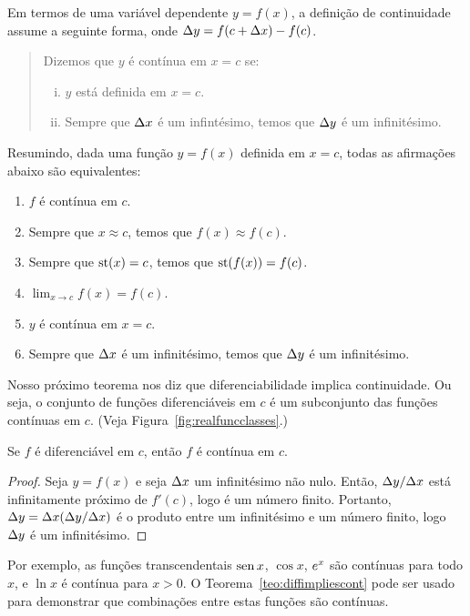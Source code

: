 Em termos de uma variável dependente $y = f(x)$, a definição de continuidade
assume a seguinte forma, onde $\Delta y = f(c + \Delta x) - f(c)$.

\begin{quote}
Dizemos que $y$ é contínua em $x = c$ se:
\begin{enumerate}[(i)]
\item $y$ está definida em $x = c$.
\item Sempre que $\Delta x$ é um infintésimo, temos que $\Delta y$ é um infinitésimo.
\end{enumerate}
\end{quote}

Resumindo, dada uma função $y = f(x)$ definida em $x = c$, todas as
afirmações abaixo são equivalentes:
\begin{enumerate}[(1)]
\item $f$ é contínua em $c$.
\item Sempre que $x \approx c$, temos que $f(x) \approx f(c)$.
\item Sempre que $\operatorname{st}(x) = c$, temos que $\operatorname{st}(f(x)) = f(c)$.
\item $\lim_{x \to c} f(x) = f(c)$.
\item $y$ é contínua em $x = c$.
\item Sempre que $\Delta x$ é um infinitésimo, temos que $\Delta y$ é um
      infinitésimo.
\end{enumerate}

Nosso próximo teorema nos diz que diferenciabilidade implica continuidade.
Ou seja, o conjunto de funções diferenciáveis em $c$ é um subconjunto das
funções contínuas em $c$. (Veja Figura~\ref{fig:realfuncclasses}.)


\begin{theorem}\label{teo:diffimpliescont}
Se $f$ é diferenciável em $c$, então $f$ é contínua em $c$.
\end{theorem}

\begin{proof}
Seja $y = f(x)$ e seja $\Delta x$ um infinitésimo não nulo. Então, $\Delta y/\Delta x$ está
infinitamente próximo de $f'(c)$, logo é um número finito. Portanto,
$\Delta y = \Delta x(\Delta y/\Delta x)$ é o produto entre um infinitésimo e um número finito,
logo $\Delta y$ é um infinitésimo.
\end{proof}

Por exemplo, as funções transcendentais $\operatorname{sen} x$, $\cos x$, $e^x$ são
contínuas para todo $x$, e $\ln x$ é contínua para $x > 0$.
O Teorema~\ref{teo:diffimpliescont} pode ser usado para demonstrar que
combinações entre estas funções são contínuas.

